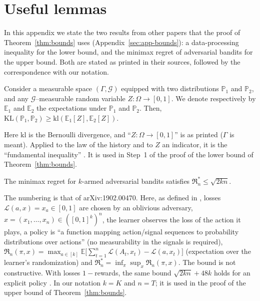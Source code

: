 \documentclass[11pt]{article}
\newcommand{\E}{\mathbb{E}}
\newcommand{\1}{\mathbf{1}}
\newcommand{\kl}{\mathrm{kl}}
\begin{document}
\appendix

\section{Useful lemmas}\label{sec:cited}

In this appendix we state the two results from other papers that the proof of Theorem~\ref{thm:bounds} uses (Appendix~\ref{sec:app-bounds}): a
data-processing inequality for the lower bound, and the minimax regret of adversarial bandits for the upper bound. Both are stated as printed in
their sources, followed by the correspondence with our notation.

\begin{lemma}\label{cite:GMS19-Lemma1}
Consider a measurable space $(\Gamma,\mathcal G)$ equipped with two distributions
$\mathbb P_1$ and $\mathbb P_2$, and any $\mathcal G$--measurable random variable $Z:\Omega\to[0,1]$. We denote
respectively by $\mathbb E_1$ and $\mathbb E_2$ the expectations under $\mathbb P_1$ and $\mathbb P_2$. Then,
$\mathrm{KL}(\mathbb P_1,\mathbb P_2)\ge\mathrm{kl}(\mathbb E_1[Z],\mathbb E_2[Z])$.
\end{lemma}
\noindent Here $\kl$ is the Bernoulli divergence, and ``$Z:\Omega\to[0,1]$'' is as printed ($\Gamma$ is meant). Applied to the law of the history and
to $Z$ an indicator, it is the ``fundamental inequality'' \citep[(6)]{GMS19}. It is used in Step~1 of the proof of the lower bound of
Theorem~\ref{thm:bounds}.

\begin{theorem}\label{cite:LS19-Thm6.1}
The minimax regret for $k$-armed adversarial bandits satisfies $\mathfrak R^*_n\le\sqrt{2kn}$.
\end{theorem}
\noindent The numbering is that of arXiv:1902.00470. Here, as defined in \citet[Section~1]{LS19}, losses
$\mathcal L(a,x)=x_a\in[0,1]$ are chosen by an oblivious adversary, $x=(x_1,\dots,x_n)\in([0,1]^k)^n$, the learner observes the loss of the action it
plays, a policy is ``a function mapping action/signal sequences to probability distributions over actions'' (no measurability
in the signals is required), $\mathfrak R_n(\pi,x)=\max_{a\in[k]}\E\big[\sum_{t=1}^n\mathcal L(A_t,x_t)-\mathcal L(a,x_t)\big]$ (expectation over the
learner's randomization) and $\mathfrak R^*_n=\inf_\pi\sup_x\mathfrak R_n(\pi,x)$. The bound is not constructive. With losses $1-$rewards, the same bound
$\sqrt{2kn}+48k$ holds for an explicit policy \citep[Theorem~11]{ZL19}. In our notation $k=K$ and $n=T$; it is used in the proof of the
upper bound of Theorem~\ref{thm:bounds}.
\end{document}
